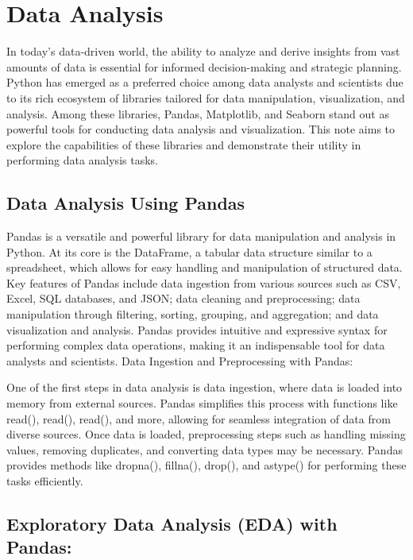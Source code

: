 \documentclass{article}
\begin{document}
\section{Data Analysis}
\vspace{1cm}
{\fontsize{15}{15}\selectfont

In today's data-driven world, the ability to analyze and derive insights from vast amounts of data is essential for informed decision-making and strategic planning. Python has emerged as a preferred choice among data analysts and scientists due to its rich ecosystem of libraries tailored for data manipulation, visualization, and analysis. Among these libraries, Pandas, Matplotlib, and Seaborn stand out as powerful tools for conducting data analysis and visualization. This note aims to explore the capabilities of these libraries and demonstrate their utility in performing data analysis tasks.

\subsection{Data Analysis Using Pandas}

Pandas is a versatile and powerful library for data manipulation and analysis in Python. At its core is the DataFrame, a tabular data structure similar to a spreadsheet, which allows for easy handling and manipulation of structured data.
Key features of Pandas include data ingestion from various sources such as CSV, Excel, SQL databases, and JSON; data cleaning and preprocessing; data manipulation through filtering, sorting, grouping, and aggregation; and data visualization and analysis.
Pandas provides intuitive and expressive syntax for performing complex data operations, making it an indispensable tool for data analysts and scientists.
Data Ingestion and Preprocessing with Pandas:

One of the first steps in data analysis is data ingestion, where data is loaded into memory from external sources. Pandas simplifies this process with functions like read\textunderscorecsv(), read\textunderscoreexcel(), read\textunderscoresql(), and more, allowing for seamless integration of data from diverse sources.
Once data is loaded, preprocessing steps such as handling missing values, removing duplicates, and converting data types may be necessary. Pandas provides methods like dropna(), fillna(), drop\textunderscoreduplicates(), and astype() for performing these tasks efficiently.

\subsection{Exploratory Data Analysis (EDA) with Pandas:}

}
\end{document}
